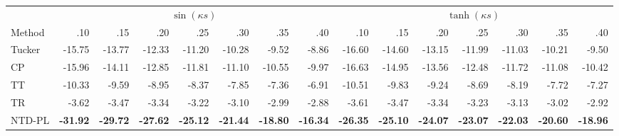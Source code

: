 \begin{tabular}{@{}lrrrrrrr@{\quad}rrrrrrr@{}}
\toprule
 & \multicolumn{7}{c}{\(\sin(\kappa s)\)} & \multicolumn{7}{c}{\(\tanh(\kappa s)\)} \\
\cmidrule(lr){2-8}\cmidrule(l){9-15}
Method & .10 & .15 & .20 & .25 & .30 & .35 & .40 & .10 & .15 & .20 & .25 & .30 & .35 & .40 \\
\midrule
Tucker & -15.75 & -13.77 & -12.33 & -11.20 & -10.28 &  -9.52 &  -8.86 & -16.60 & -14.60 & -13.15 & -11.99 & -11.03 & -10.21 &  -9.50 \\
CP     & -15.96 & -14.11 & -12.85 & -11.81 & -11.10 & -10.55 &  -9.97 & -16.63 & -14.95 & -13.56 & -12.48 & -11.72 & -11.08 & -10.42 \\
TT     & -10.33 &  -9.59 &  -8.95 &  -8.37 &  -7.85 &  -7.36 &  -6.91 & -10.51 &  -9.83 &  -9.24 &  -8.69 &  -8.19 &  -7.72 &  -7.27 \\
TR     &  -3.62 &  -3.47 &  -3.34 &  -3.22 &  -3.10 &  -2.99 &  -2.88 &  -3.61 &  -3.47 &  -3.34 &  -3.23 &  -3.13 &  -3.02 &  -2.92 \\
\midrule
NTD-PL & \textbf{-31.92} & \textbf{-29.72} & \textbf{-27.62} & \textbf{-25.12} & \textbf{-21.44} & \textbf{-18.80} & \textbf{-16.34} & \textbf{-26.35} & \textbf{-25.10} & \textbf{-24.07} & \textbf{-23.07} & \textbf{-22.03} & \textbf{-20.60} & \textbf{-18.96} \\
\bottomrule
\end{tabular}
